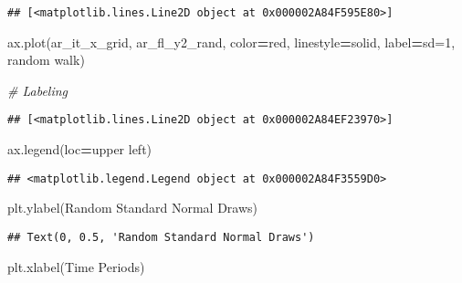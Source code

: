 \documentclass[
]{book}
\newenvironment{Shaded}{\begin{snugshade}}{\end{snugshade}}
\newcommand{\CommentTok}[1]{\textcolor[rgb]{0.56,0.35,0.01}{\textit{#1}}}
\newcommand{\NormalTok}[1]{#1}
\newcommand{\OperatorTok}[1]{\textcolor[rgb]{0.81,0.36,0.00}{\textbf{#1}}}
\newcommand{\StringTok}[1]{\textcolor[rgb]{0.31,0.60,0.02}{#1}}
\begin{document}
\begin{verbatim}
## [<matplotlib.lines.Line2D object at 0x000002A84F595E80>]
\end{verbatim}

\begin{Shaded}
\begin{Highlighting}[]
\NormalTok{ax.plot(ar\_it\_x\_grid, ar\_fl\_y2\_rand,}
\NormalTok{                     color}\OperatorTok{=}\StringTok{\textquotesingle{}red\textquotesingle{}}\NormalTok{, linestyle}\OperatorTok{=}\StringTok{\textquotesingle{}solid\textquotesingle{}}\NormalTok{,}
\NormalTok{                     label}\OperatorTok{=}\StringTok{\textquotesingle{}sd=1, random walk\textquotesingle{}}\NormalTok{)}
                     
\CommentTok{\# Labeling}
\end{Highlighting}
\end{Shaded}

\begin{verbatim}
## [<matplotlib.lines.Line2D object at 0x000002A84EF23970>]
\end{verbatim}

\begin{Shaded}
\begin{Highlighting}[]
\NormalTok{ax.legend(loc}\OperatorTok{=}\StringTok{\textquotesingle{}upper left\textquotesingle{}}\NormalTok{)}
\end{Highlighting}
\end{Shaded}

\begin{verbatim}
## <matplotlib.legend.Legend object at 0x000002A84F3559D0>
\end{verbatim}

\begin{Shaded}
\begin{Highlighting}[]
\NormalTok{plt.ylabel(}\StringTok{\textquotesingle{}Random Standard Normal Draws\textquotesingle{}}\NormalTok{)}
\end{Highlighting}
\end{Shaded}

\begin{verbatim}
## Text(0, 0.5, 'Random Standard Normal Draws')
\end{verbatim}

\begin{Shaded}
\begin{Highlighting}[]
\NormalTok{plt.xlabel(}\StringTok{\textquotesingle{}Time Periods\textquotesingle{}}\NormalTok{)}
\end{Highlighting}
\end{Shaded}
\end{document}
